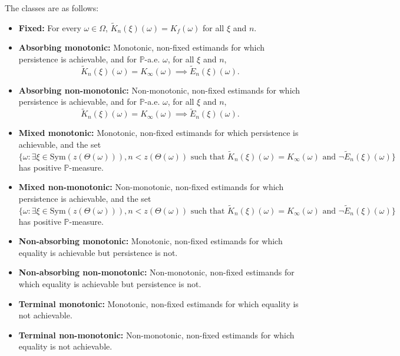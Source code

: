 \documentclass{article}
\newcommand{\1}{\mathbbm{1}}
\begin{document}
The classes are as follows:
\begin{itemize}
    \item \textbf{Fixed:} For every $\omega \in \Omega$, $\widetilde K_n(\xi)(\omega) = K_f(\omega)$ for all $\xi$ and $n$.
    \item \textbf{Absorbing monotonic:} Monotonic, non-fixed estimands for which persistence is achievable, and for $\mathbb{P}$-a.e. $\omega$, for all $\xi$ and $n$,
    \[
    \widetilde K_n(\xi)(\omega) = K_\infty(\omega) \implies \widetilde E_n(\xi)(\omega).
    \]
    \item \textbf{Absorbing non-monotonic:} Non-monotonic, non-fixed estimands for which persistence is achievable, and for $\mathbb{P}$-a.e. $\omega$, for all $\xi$ and $n$,
    \[
    \widetilde K_n(\xi)(\omega) = K_\infty(\omega) \implies \widetilde E_n(\xi)(\omega).
    \]
    \item \textbf{Mixed monotonic:} Monotonic, non-fixed estimands for which persistence is achievable, and the set
    \[
    \{\omega : \exists \xi \in \mathrm{Sym}(z(\Theta(\omega))), n < z(\Theta(\omega)) \text{ such that } \widetilde K_n(\xi)(\omega)=K_\infty(\omega) \text{ and } \lnot\widetilde E_n(\xi)(\omega)\}
    \]
    has positive $\mathbb{P}$-measure.
    \item \textbf{Mixed non-monotonic:} Non-monotonic, non-fixed estimands for which persistence is achievable, and the set
    \[
    \{\omega : \exists \xi \in \mathrm{Sym}(z(\Theta(\omega))), n < z(\Theta(\omega)) \text{ such that } \widetilde K_n(\xi)(\omega)=K_\infty(\omega) \text{ and } \lnot\widetilde E_n(\xi)(\omega)\}
    \]
    has positive $\mathbb{P}$-measure.
    \item \textbf{Non-absorbing monotonic:} Monotonic, non-fixed estimands for which equality is achievable but persistence is not.
    \item \textbf{Non-absorbing non-monotonic:} Non-monotonic, non-fixed estimands for which equality is achievable but persistence is not.
    \item \textbf{Terminal monotonic:} Monotonic,  non-fixed estimands for which equality is not achievable.
    \item \textbf{Terminal non-monotonic:} Non-monotonic, non-fixed estimands for which equality is not achievable.
\end{itemize}
\end{document}
